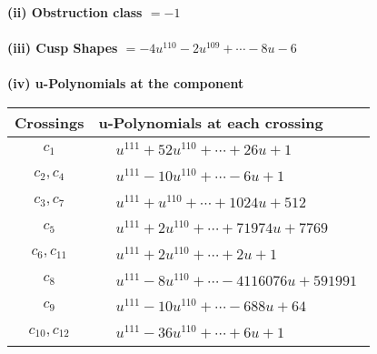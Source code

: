 \documentclass[1p]{elsarticle_modified}
\theoremstyle{definition}
\begin{document}
\flushleft \textbf{(ii) Obstruction class $= -1$}\\~\\
\flushleft \textbf{(iii) Cusp Shapes $= -4 u^{110}-2 u^{109}+\cdots-8 u-6$}\\~\\
\newpage\renewcommand{\arraystretch}{1}
\flushleft \textbf{(iv) u-Polynomials at the component}\newline \\
\begin{tabular}{m{50pt}|m{274pt}}
Crossings & \hspace{64pt}u-Polynomials at each crossing \\
\hline $$\begin{aligned}c_{1}\end{aligned}$$&$\begin{aligned}
&u^{111}+52 u^{110}+\cdots+26 u+1
\end{aligned}$\\
\hline $$\begin{aligned}c_{2},c_{4}\end{aligned}$$&$\begin{aligned}
&u^{111}-10 u^{110}+\cdots-6 u+1
\end{aligned}$\\
\hline $$\begin{aligned}c_{3},c_{7}\end{aligned}$$&$\begin{aligned}
&u^{111}+u^{110}+\cdots+1024 u+512
\end{aligned}$\\
\hline $$\begin{aligned}c_{5}\end{aligned}$$&$\begin{aligned}
&u^{111}+2 u^{110}+\cdots+71974 u+7769
\end{aligned}$\\
\hline $$\begin{aligned}c_{6},c_{11}\end{aligned}$$&$\begin{aligned}
&u^{111}+2 u^{110}+\cdots+2 u+1
\end{aligned}$\\
\hline $$\begin{aligned}c_{8}\end{aligned}$$&$\begin{aligned}
&u^{111}-8 u^{110}+\cdots-4116076 u+591991
\end{aligned}$\\
\hline $$\begin{aligned}c_{9}\end{aligned}$$&$\begin{aligned}
&u^{111}-10 u^{110}+\cdots-688 u+64
\end{aligned}$\\
\hline $$\begin{aligned}c_{10},c_{12}\end{aligned}$$&$\begin{aligned}
&u^{111}-36 u^{110}+\cdots+6 u+1
\end{aligned}$\\
\hline
\end{tabular}\\~\\
\end{document}
